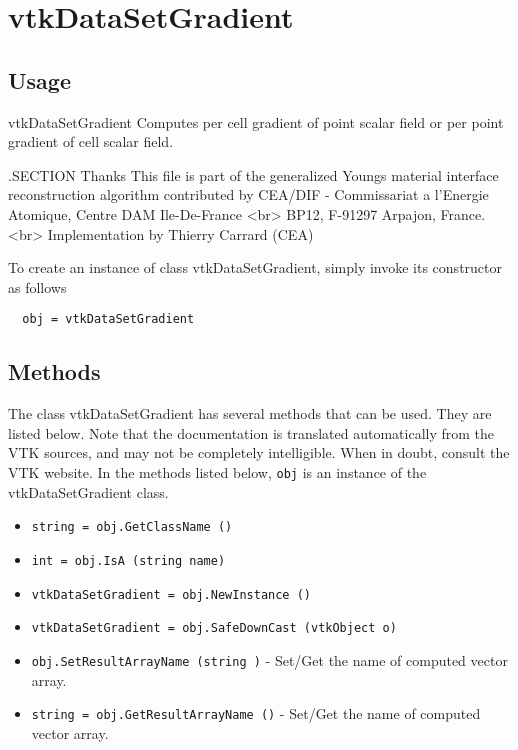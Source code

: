 \section{vtkDataSetGradient}

\subsection{Usage}

 vtkDataSetGradient Computes per cell gradient of point scalar field
 or per point gradient of cell scalar field.

 .SECTION Thanks
 This file is part of the generalized Youngs material interface reconstruction algorithm contributed by
 CEA/DIF - Commissariat a l'Energie Atomique, Centre DAM Ile-De-France <br>
 BP12, F-91297 Arpajon, France. <br>
 Implementation by Thierry Carrard (CEA)

To create an instance of class vtkDataSetGradient, simply
invoke its constructor as follows
\begin{verbatim}
  obj = vtkDataSetGradient
\end{verbatim}
\subsection{Methods}

The class vtkDataSetGradient has several methods that can be used.
  They are listed below.
Note that the documentation is translated automatically from the VTK sources,
and may not be completely intelligible.  When in doubt, consult the VTK website.
In the methods listed below, \verb|obj| is an instance of the vtkDataSetGradient class.
\begin{itemize}
\item  \verb|string = obj.GetClassName ()|

\item  \verb|int = obj.IsA (string name)|

\item  \verb|vtkDataSetGradient = obj.NewInstance ()|

\item  \verb|vtkDataSetGradient = obj.SafeDownCast (vtkObject o)|

\item  \verb|obj.SetResultArrayName (string )| -  Set/Get the name of computed vector array.

\item  \verb|string = obj.GetResultArrayName ()| -  Set/Get the name of computed vector array.

\end{itemize}
